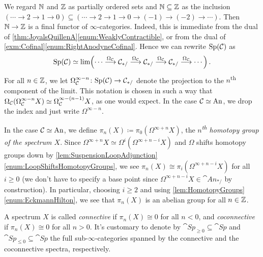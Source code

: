 \begin{con}\label{con:HomotopyGroupsOfSpectra}
	We regard $\mathbb{N}$ and $\mathbb{Z}$ as partially ordered sets and $\mathbb{N}\subseteq \mathbb{Z}$ as the inclusion $(\dotsb\rightarrow 2\rightarrow 1\rightarrow0)\subseteq (\dotsb\rightarrow 2\rightarrow 1 \rightarrow 0\rightarrow (-1)\rightarrow (-2)\rightarrow\dotsb)$. Then $\mathbb{N}\rightarrow \mathbb{Z}$ is a final functor of $\infty$-categories. Indeed, this is immediate from the dual of \cref{thm:JoyalsQuillenA}\cref{enum:WeaklyContractible}, or from the dual of \cref{exm:Cofinal}\cref{enum:RightAnodyneCofinal}. Hence we can rewrite $\mathrm{Sp}(\mathcal{C})$ as
	\begin{equation*}
		\cat{Sp}(\Cc)\simeq \limit\left(\dotsb\overset{\Omega_\Cc}{\longrightarrow} \Cc_{*/}\overset{\Omega_\Cc}{\longrightarrow} \Cc_{*/}\overset{\Omega_\Cc}{\longrightarrow} \Cc_{*/}\overset{\Omega_\Cc}{\longrightarrow}\dotsb\right)\,.
	\end{equation*}
	For all $n\in\mathbb{Z}$, we let $\Omega_{\mathcal{C}}^{\infty-n}\colon \mathrm{Sp}(\mathcal{C})\rightarrow \mathcal{C}_{*/}$ denote the projection to the $n$\textsuperscript{th} component of the limit. This notation is chosen in such a way that $\Omega_{\mathcal{C}}(\Omega_{\mathcal{C}}^{\infty-n}X)\simeq \Omega_{\mathcal{C}}^{\infty-(n-1)}X$, as one would expect. In the case $\mathcal{C}\simeq \mathrm{An}$, we drop the index and just write $\Omega^{\infty-n}$.
	
	In the case $\mathcal{C}\simeq \mathrm{An}$, we define $\pi_n(X)\coloneqq \pi_0(\Omega^{\infty+n}X)$, the \emph{$n$\textsuperscript{th} homotopy group of the spectrum $X$}. Since $\Omega^{\infty+n}X\simeq \Omega^i(\Omega^{\infty+n-i}X)$ and $\Omega$ shifts homotopy groups down by \cref{lem:SuspensionLoopAdjunction}\cref{enum:LoopShiftsHomotopyGroups}, we see $\pi_n(X)\cong \pi_i(\Omega^{\infty+n-i}X)$ for all $i\geqslant 0$ (we don't have to specify a base point since $\Omega^{\infty+n-i}X\in\cat{An}_{*/}$ by construction). In particular, choosing $i\geqslant 2$ and using \cref{lem:HomotopyGroups}\cref{enum:EckmannHilton}, we see that $\pi_n(X)$ is an abelian group for all $n\in\mathbb{Z}$.
	
	A spectrum $X$ is called \emph{connective} if $\pi_n(X)\cong 0$ for all $n<0$, and \emph{coconnective} if $\pi_n(X)\cong 0$ for all $n>0$. It's customary to denote by $\cat{Sp}_{\geqslant 0}\subseteq \cat{Sp}$ and $\cat{Sp}_{\leqslant 0}\subseteq \cat{Sp}$ the full sub-$\infty$-categories spanned by the connective and the coconnective spectra, respectively.
\end{con}
